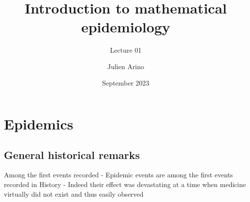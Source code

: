 \documentclass[aspectratio=43]{beamer}
\title{Introduction to mathematical epidemiology}
\subtitle{Lecture 01}
\author{Julien Arino}
\date{September 2023}
\begin{document}


\begin{frame}
  \titlepage
\end{frame}
\addtocounter{page}{-1}

\section{Epidemics}

\subsection{General historical remarks}
\begin{frame}{Among the first events recorded}
- Epidemic events are among the first events recorded in History
\vfill
- Indeed their effect was devastating at a time when medicine virtually did not exist and thus easily observed
\end{frame}
\end{document}
